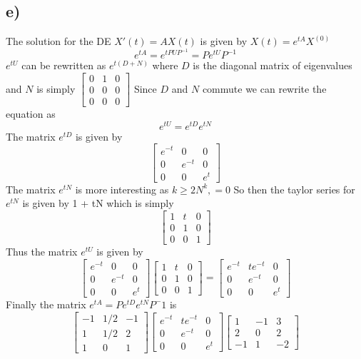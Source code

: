 \documentclass{article}
\begin{document}
\subsection*{e)}
The solution for the DE $X'(t) = AX(t)$ is given by $X(t) = e^{tA}X^{(0)}$ 
$$ e^{tA} =  e^{tPUP^{-1}} = Pe^{tU}P^{-1}$$
$e^{tU}$ can be rewritten as $e^{t(D+N)}$ where $D$ is the diagonal matrix of eigenvalues and $N$ is simply $\begin{bmatrix}
    0 & 1 & 0\\
    0 & 0 & 0\\
    0 & 0 & 0
\end{bmatrix}$
Since $D$ and $N$ commute we can rewrite the equation as
$$e^{tU} = e^{tD}e^{tN}$$
The matrix $e^{tD}$ is given by
$$\begin{bmatrix}
    e^{-t} & 0 & 0\\
    0 & e^{-t} & 0\\
    0 & 0 & e^t
\end{bmatrix} $$
The matrix $e^{tN}$ is more interesting as $ k \geq 2 N^k, = 0$ So then the taylor series for $e^{tN}$ is given by 1 + tN which is simply
$$\begin{bmatrix}
    1 & t & 0\\
    0 & 1 & 0\\
    0 & 0 & 1
\end{bmatrix} $$
Thus the matrix $e^{tU}$ is given by
$$ \begin{bmatrix}
    e^{-t} & 0 & 0\\
    0 & e^{-t} & 0\\
    0 & 0 & e^t
\end{bmatrix} \begin{bmatrix}
    1 & t & 0\\
    0 & 1 & 0\\
    0 & 0 & 1
\end{bmatrix} = \begin{bmatrix}
    e^{-t} & te^{-t} & 0\\
    0 & e^{-t} & 0\\
    0 & 0 & e^t
\end{bmatrix}$$
Finally the matrix $e^{tA} = Pe^{tD}e^{tN}P^-1$ is 
$$ \begin{bmatrix}
    -1 & 1/2 & -1\\
    1 & 1/2 & 2\\
    1 & 0 & 1
\end{bmatrix} \begin{bmatrix}
    e^{-t} & te^{-t} & 0\\
    0 & e^{-t} & 0\\
    0 & 0 & e^t
\end{bmatrix} \begin{bmatrix}
    1 & -1 & 3\\
    2 & 0 & 2\\
    -1 & 1 & -2
\end{bmatrix} $$
\end{document}

